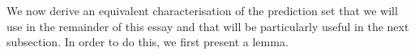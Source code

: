 \documentclass[11pt, titlepage]{article} %
\newcommand{\R}{\mathrm}
\newcommand{\Ind}[1]{\mathbbm{1}\left\{ #1 \right\}}
\numberwithin{equation}{section}
\newtheorem{lemma}{Lemma}
\theoremstyle{definition}
\numberwithin{theorem}{section}
\numberwithin{lemma}{section}
\numberwithin{corollary}{section}
\numberwithin{proposition}{section}
\numberwithin{definition}{section}
\numberwithin{remark}{section}
\begin{document}
\noindent
We now derive an equivalent characterisation of the prediction set that we will use in the remainder of this essay and that will be particularly useful in the next subsection. In order to do this, we first present a lemma.


\end{document}
